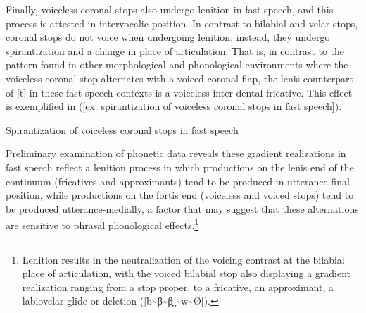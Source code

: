 Finally, voiceless coronal stops also undergo lenition in fast speech, and this process is attested in intervocalic position. In contrast to bilabial and velar stops, coronal stops do not voice when undergoing lenition; instead, they undergo spirantization and a change in place of articulation. That is, in contrast to the pattern found in other morphological and phonological environments where the voiceless coronal stop alternates with a voiced coronal flap, the lenis counterpart of [t] in these fast speech contexts is a voiceless inter-dental fricative. This effect is exemplified in (\ref{ex: spirantization of voiceless coronal stops in fast speech}).


\ea\label{ex: spirantization of voiceless coronal stops in fast speech}
{Spirantization of voiceless coronal stops in fast speech}

    \z
\z

Preliminary examination of phonetic data reveals these gradient realizations in fast speech reflect a lenition process in which productions on the lenis end of the continuum (fricatives and approximants) tend to be produced in utterance-final position, while productions on the fortis end (voiceless and voiced stops) tend to be produced utterance-medially, a factor that may suggest that these alternations are sensitive to phrasal phonological effects.\footnote{Lenition results in the neutralization of the voicing contrast at the bilabial place of articulation, with the voiced bilabial stop also displaying a gradient realization ranging from a stop proper, to a fricative, an approximant, a labiovelar glide or deletion ([b{\textasciitilde}β{\textasciitilde}β̞ ̞{\textasciitilde}w{\textasciitilde}Ø]).}{}

